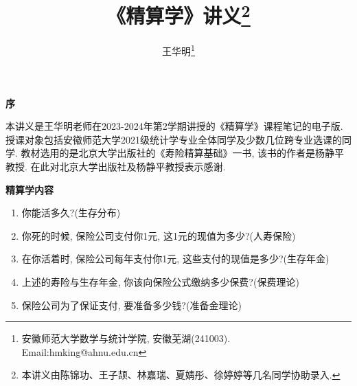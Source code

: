 \documentclass[a4paper,10pt]{ctexbook}
\newcommand{\hei}{\CJKfamily{hei}}      %
\begin{document}
\def\proof{\noindent{\bf\hei 证明.~~}}

\def\solution{\noindent{\bf\hei 解.~~}}


%

\title{\Huge\textbf{《精算学》讲义}\footnote{本讲义由陈锦功、王子颉、林嘉瑞、夏婧彤、徐婷婷等几名同学协助录入.}}

\author{王华明\thanks{安徽师范大学数学与统计学院, 安徽芜湖(241003).  Email:hmking@ahnu.edu.cn}}
\date{}
\frontmatter
\maketitle

\vspace{-6mm}

\large
\begin{center}
    \begin{minipage}[c]{12cm}
        \begin{center}\textbf{序}\quad \end{center}
        \vspace{-0em} \hspace{2em} 本讲义是王华明老师在2023-2024年第2学期讲授的《精算学》课程笔记的电子版. 授课对象包括安徽师范大学2021级统计学专业全体同学及少数几位跨专业选课的同学. 教材选用的是北京大学出版社的《寿险精算基础》一书, 该书的作者是杨静平教授. 在此对北京大学出版社及杨静平教授表示感谢.

    \end{minipage}
\end{center}



%
\newpage

\begin{center}
    {\bf\hei 精算学内容}
\end{center}
\begin{enumerate}
    \item 你能活多久?(生存分布)
    \item 你死的时候, 保险公司支付你1元, 这1元的现值为多少?(人寿保险)
    \item 在你活着时, 保险公司每年支付你1元, 这些支付的现值是多少?(生存年金)
    \item 上述的寿险与生存年金, 你该向保险公式缴纳多少保费?(保费理论)
    \item 保险公司为了保证支付, 要准备多少钱?(准备金理论)
\end{enumerate}
\newpage
\thispagestyle{empty}
\end{document}
